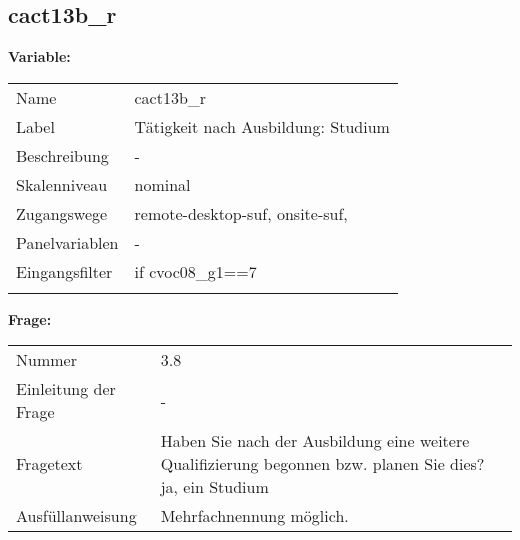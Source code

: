 	
	
	\subsection{cact13b\_r}
	\label{subSection:cact13b_r}

	\noindent\textbf{Variable:}\\
		\begin{tabular}{lL{11.3cm}}
			\label{tableVariable:cact13b_r}
			Name & cact13b\_r \\
			Label & Tätigkeit nach Ausbildung: Studium \\
			Beschreibung & - \\
			Skalenniveau & nominal \\
			Zugangswege &
				remote-desktop-suf,
				onsite-suf,
 \\
			Panelvariablen & -
			 \\
			Eingangsfilter & if cvoc08\_g1==7 \\
 \\
		\end{tabular}

		\vspace*{1 cm}
		\noindent\textbf{Frage:}\\
		\begin{tabular}{lL{11.3cm}}
			\label{tableQuestion:cact13b_r}
			Nummer & 3.8 \\
			Einleitung der Frage & - \\
			Fragetext & Haben Sie nach der Ausbildung eine weitere Qualifizierung begonnen bzw. planen Sie dies?
ja, ein Studium \\
			Ausfüllanweisung & Mehrfachnennung möglich. \\
		\end{tabular}





